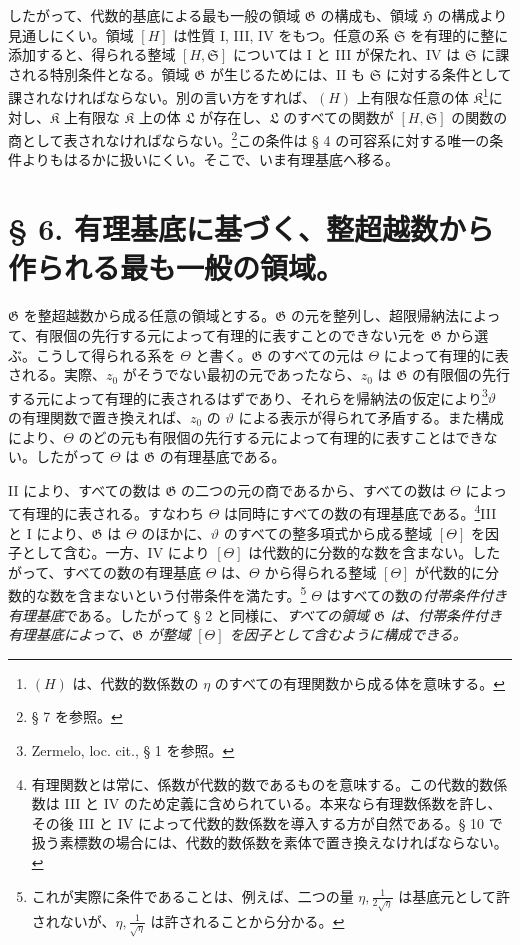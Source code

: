 したがって、代数的基底による最も一般の領域 $\mathfrak G$ の構成も、領域 $\mathfrak H$ の構成より見通しにくい。領域 $[H]$ は性質 I, III, IV をもつ。任意の系 $\mathfrak S$ を有理的に整に添加すると、得られる整域 $[H,\mathfrak S]$ については I と III が保たれ、IV は $\mathfrak S$ に課される特別条件となる。領域 $\mathfrak G$ が生じるためには、II も $\mathfrak S$ に対する条件として課されなければならない。別の言い方をすれば、$(H)$ 上有限な任意の体 $\mathfrak K$\footnote{$(H)$ は、代数的数係数の $\eta$ のすべての有理関数から成る体を意味する。}に対し、$\mathfrak K$ 上有限な $\mathfrak K$ 上の体 $\mathfrak L$ が存在し、$\mathfrak L$ のすべての関数が $[H,\mathfrak S]$ の関数の商として表されなければならない。\footnote{§ 7 を参照。}この条件は § 4 の可容系に対する唯一の条件よりもはるかに扱いにくい。そこで、いま有理基底へ移る。

\section*{§ 6. 有理基底に基づく、整超越数から作られる最も一般の領域。}

$\mathfrak G$ を整超越数から成る任意の領域とする。$\mathfrak G$ の元を整列し、超限帰納法によって、有限個の先行する元によって有理的に表すことのできない元を $\mathfrak G$ から選ぶ。こうして得られる系を $\Theta$ と書く。$\mathfrak G$ のすべての元は $\Theta$ によって有理的に表される。実際、$z_0$ がそうでない最初の元であったなら、$z_0$ は $\mathfrak G$ の有限個の先行する元によって有理的に表されるはずであり、それらを帰納法の仮定により\footnote{Zermelo, loc. cit., § 1 を参照。}$\vartheta$ の有理関数で置き換えれば、$z_0$ の $\vartheta$ による表示が得られて矛盾する。また構成により、$\Theta$ のどの元も有限個の先行する元によって有理的に表すことはできない。したがって $\Theta$ は $\mathfrak G$ の有理基底である。

II により、すべての数は $\mathfrak G$ の二つの元の商であるから、すべての数は $\Theta$ によって有理的に表される。すなわち $\Theta$ は同時にすべての数の有理基底である。\footnote{有理関数とは常に、係数が代数的数であるものを意味する。この代数的数係数は III と IV のため定義に含められている。本来なら有理数係数を許し、その後 III と IV によって代数的数係数を導入する方が自然である。§ 10 で扱う素標数の場合には、代数的数係数を素体で置き換えなければならない。}III と I により、$\mathfrak G$ は $\Theta$ のほかに、$\vartheta$ のすべての整多項式から成る整域 $[\Theta]$ を因子として含む。一方、IV により $[\Theta]$ は代数的に分数的な数を含まない。したがって、すべての数の有理基底 $\Theta$ は、$\Theta$ から得られる整域 $[\Theta]$ が代数的に分数的な数を含まないという付帯条件を満たす。\footnote{これが実際に条件であることは、例えば、二つの量 $\eta,\frac1{2\sqrt{\eta}}$ は基底元として許されないが、$\eta,\frac1{\sqrt{\eta}}$ は許されることから分かる。} $\Theta$ はすべての数の\emph{付帯条件付き有理基底}である。したがって § 2 と同様に、\emph{すべての領域 $\mathfrak G$ は、付帯条件付き有理基底によって、$\mathfrak G$ が整域 $[\Theta]$ を因子として含むように構成できる。}

